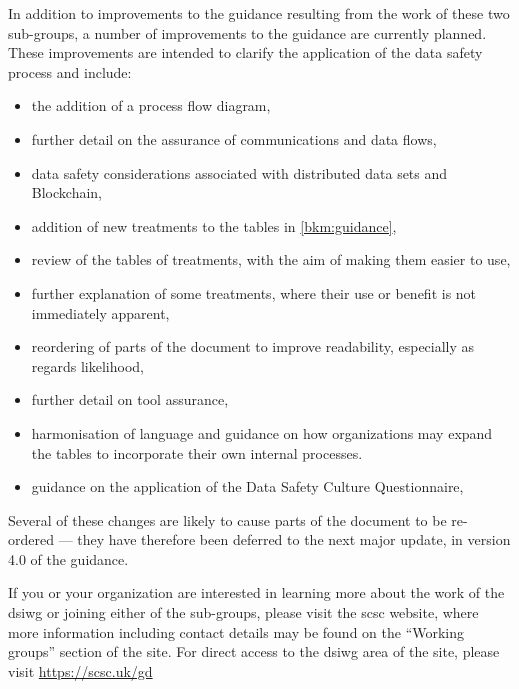 In addition to improvements to the guidance resulting from the work of these two sub-groups,
a number of improvements to the guidance are currently planned.
These improvements are intended to clarify the application of the data safety process
and include:
\begin{itemize}
\item the addition of a process flow diagram,
\item further detail on the assurance of communications and data flows,
\item data safety considerations associated with distributed data sets and Blockchain,
\item addition of new treatments to the tables in \autoref{bkm:guidance},
\item review of the tables of treatments, with the aim of making them easier to use,
\item further explanation of some treatments, where their use or benefit is not immediately apparent, 
\item reordering of parts of the document to improve readability, especially as regards likelihood, 
\item further detail on tool assurance,
\item harmonisation of language and guidance on how organizations may expand the tables to incorporate their own internal processes.
\item guidance on the application of the Data Safety Culture Questionnaire,
\end{itemize}
Several of these changes are likely to
cause parts of the document to be re-ordered --- they have therefore been deferred to the next major update, in version 4.0 of the guidance.

If you or your organization are interested in learning more about the work of the \gls{dsiwg} or joining either of the sub-groups,
please visit the \gls{scsc} website, where more information including contact details may be found on the ``Working groups'' section of the site. For direct access to the \gls{dsiwg} area of the site, please visit \href{https://scsc.uk/gd}{https://scsc.uk/gd}
%
%
%
